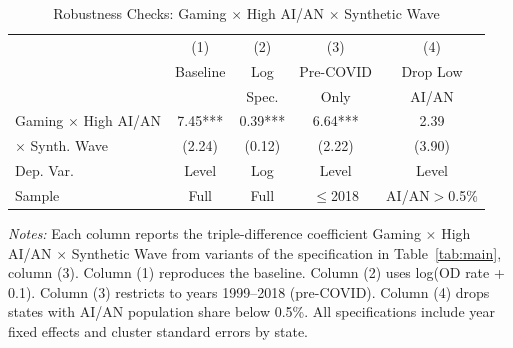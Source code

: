 \begin{table}[htbp]
\centering
\caption{Robustness Checks: Gaming $\times$ High AI/AN $\times$ Synthetic Wave}
\label{tab:robustness}
\begin{tabular}{lcccc}
\hline\hline
 & (1) & (2) & (3) & (4) \\
 & Baseline & Log & Pre-COVID & Drop Low \\
 & & Spec. & Only & AI/AN \\
\hline
Gaming $\times$ High AI/AN &  7.45***  &  0.39***  &  6.64***  &  2.39  \\
\quad $\times$ Synth. Wave &  (2.24)  &  (0.12)  &  (2.22)  &  (3.90)  \\
\hline
Dep. Var. & Level & Log & Level & Level \\
Sample & Full & Full & $\leq$2018 & AI/AN$>$0.5\% \\
\hline\hline
\end{tabular}
\begin{tablenotes}[flushleft]\footnotesize
\item \textit{Notes:} Each column reports the triple-difference coefficient Gaming $\times$ High AI/AN $\times$ Synthetic Wave from variants of the specification in Table~\ref{tab:main}, column (3). Column (1) reproduces the baseline. Column (2) uses log(OD rate + 0.1). Column (3) restricts to years 1999--2018 (pre-COVID). Column (4) drops states with AI/AN population share below 0.5\%. All specifications include year fixed effects and cluster standard errors by state.
\end{tablenotes}
\end{table}
